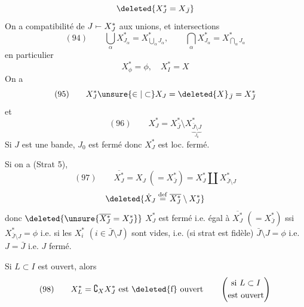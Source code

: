 
\[
\deleted{X_J^*=X_{\bar J}}
\]
On a compatibilité de $J\mathrel{\mapstochar\relbar}X_J^*$ aux unions, et intersections
\[
(94)\qquad\bigcup_\alpha X_{J_\alpha}^*=X_{\bigcup_\alpha J_\alpha}^*,\qquad\bigcap_\alpha X_{J_\alpha}^*=X_{\bigcap_\alpha J_\alpha}^*
\]
en particulier
\[
X_\phi^*=\phi,\quad X_I^*=X
\]
On a
\[
(95)\qquad X_J^*\unsure{\in|\subset}X_J=\deleted{X}_{\bar J}=X_{\bar J}^*
\]
et
\[
(96)\qquad X_J^*=X_{\bar J}^*\setminus X_{\underbrace{\bar J\setminus J}_{J_0}}^*
\]
Si $J$ est une bande, $J_0$ est fermé donc $X_J^*$ est loc. fermé.

Si on a (Strat 5), 
\[
(97)\qquad\overline{X_J^*}=X_J\ (=X_{\bar J}^*)=X_J^*\amalg X_{\bar J\setminus J}^*
\]
\[
\deleted{\dot X_J\overset{\mathrm{def}}=\overline{X_J^*}\setminus X_J^*}
\]
donc $\deleted{\unsure{\overline{X_J^*}=X_J^*}}$ $X_J^*$ est fermé i.e. égal à $\overline{X_J^*}$ $(=X_{\bar J}^*)$ ssi $X_{\bar J\setminus J}^*=\phi$ i.e. si les $X_i^*$ $(i\in\bar J\setminus J)$ sont vides, i.e. (si strat est fidèle)  $\bar J\setminus J=\phi$ i.e. $J=\bar J$ i.e. $J$ fermé.

Si  $L\subset I$ est ouvert,  alors
\[
(98)\qquad X_L^*=\complement_X X_J^*\text{ est }\text{\deleted{f}}\text{ ouvert}\qquad\left(\begin{gathered}\text{si }L\subset I\\\text{est ouvert}\end{gathered}\right)
\]
